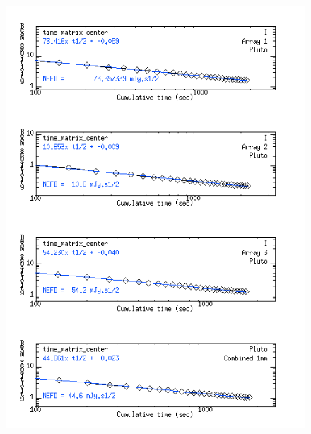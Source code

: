 \begin{figure}
\begin{center}
\includegraphics[clip, angle=0, scale=0.4]{Figures/Pluto_8_sigma_vs_time_matrix_center.png}

\end{center}
\end{figure}
